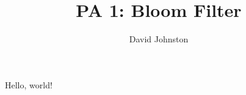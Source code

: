 \documentclass{article}
\title{PA 1: Bloom Filter}
\author{David Johnston}
\begin{document}
\maketitle

Hello, world!
\end{document}
